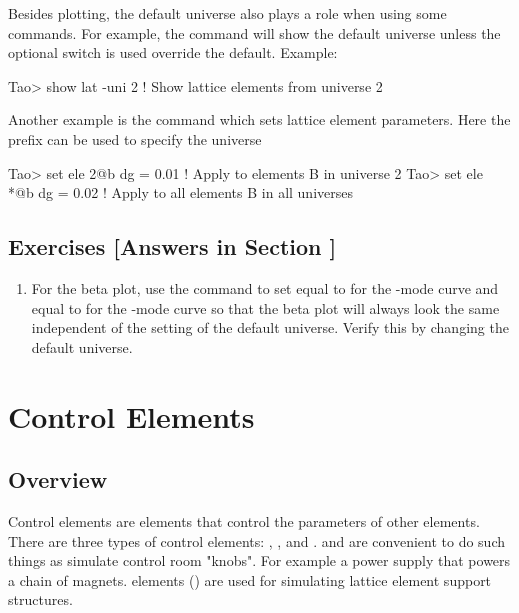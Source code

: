 \documentclass{hitec}     %
\newcommand{\Section}[1]{\section{#1}\vspace*{-1ex}}
\begin{document}
{Besides plotting, the default universe also plays a role when using some \tao commands. For example,
the  command will show the default universe unless the optional  switch is
used override the default. Example:
\begin{code}
Tao> show lat -uni 2    ! Show lattice elements from universe 2
\end{code}

Another example is the  command which sets lattice element parameters. Here the  prefix
can be used to specify the universe
\begin{code}
Tao> set ele 2@b dg = 0.01   ! Apply to elements B in universe 2
Tao> set ele *@b dg = 0.02   ! Apply to all elements B in all universes
\end{code}

\subsection{Exercises [Answers in Section ]}
\label{s:multi.uni.ex}

\begin{enumerate}[label=\thesection.\arabic{enumi}]
\item
For the beta plot, use the  command to set  equal to  for the
-mode curve and  equal to  for the -mode curve so that the beta
plot will always look the same independent of the setting of the default universe. Verify this by
changing the default universe.
\end{enumerate}

\newpage

\Section{Control Elements}
\label{s:control}

\subsection{Overview}

Control elements are elements that control the parameters of other elements. There are three types
of control elements: , , and .  and
 are convenient to do such things as simulate control room "knobs". For example a power
supply that powers a chain of magnets.  elements ()
are used for simulating lattice element support structures.

}
\end{document}
